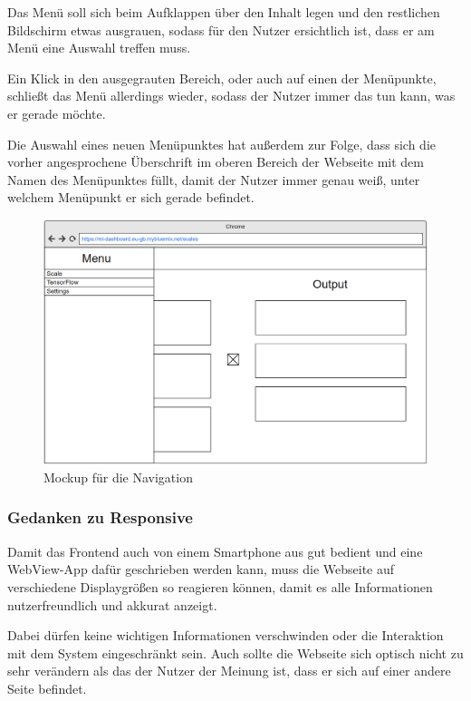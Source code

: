 Das Menü soll sich beim Aufklappen über den Inhalt legen und den restlichen Bildschirm etwas ausgrauen, sodass für den
Nutzer ersichtlich ist, dass er am Menü eine Auswahl treffen muss.

Ein Klick in den ausgegrauten Bereich, oder auch auf einen der Menüpunkte, schließt das Menü allerdings wieder, sodass
der Nutzer immer das tun kann, was er gerade möchte.

Die Auswahl eines neuen Menüpunktes hat außerdem zur Folge, dass sich die vorher angesprochene Überschrift im oberen
Bereich der Webseite mit dem Namen des Menüpunktes füllt, damit der Nutzer immer genau weiß, unter welchem Menüpunkt
er sich gerade befindet.

\begin{figure}[h]
    \centering
    \includegraphics[width=\textwidth]{images/kapitel_4/mockup_scale_menu.png}
    \caption{Mockup für die Navigation}
    \label{fig:umsetzung_mockup_scale_menu}
\end{figure}

\subsubsection{Gedanken zu Responsive}
Damit das Frontend auch von einem Smartphone aus gut bedient und eine WebView-App dafür geschrieben werden kann, muss
die Webseite auf verschiedene Displaygrößen so reagieren können, damit es alle Informationen nutzerfreundlich und
akkurat anzeigt.

Dabei dürfen keine wichtigen Informationen verschwinden oder die Interaktion mit dem System eingeschränkt sein. Auch
sollte die Webseite sich optisch nicht zu sehr verändern als das der Nutzer der Meinung ist, dass er sich auf einer
andere Seite befindet.


